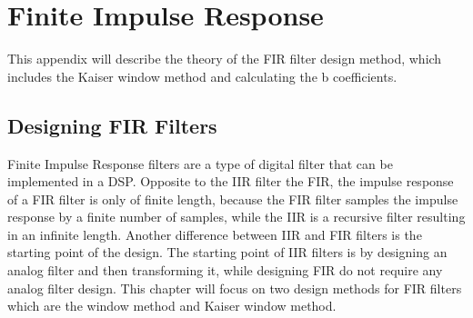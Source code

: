 \chapter{Finite Impulse Response} \label{app:FIR_theory}
This appendix will describe the theory of the FIR filter design method, which includes the Kaiser window method and calculating the b coefficients.

\section{Designing FIR Filters}

Finite Impulse Response filters are a type of digital filter that can be implemented in a DSP. Opposite to the IIR filter the FIR, the impulse response of a FIR filter is only of finite length, because the FIR filter samples the impulse response by a finite number of samples, while the IIR is a recursive filter resulting in an infinite length. Another difference between IIR and FIR filters is the starting point of the design. The starting point of IIR filters is by designing an analog filter and then transforming it, while designing FIR do not require any analog filter design. This chapter will focus on two design methods for FIR filters which are the window method and Kaiser window method.

